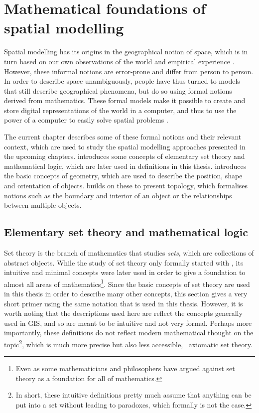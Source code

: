 
\chapter{Mathematical foundations of spatial modelling}
\label{ch:modelling-mathematics}

Spatial modelling has its origins in the geographical notion of space, which is in turn based on our own observations of the world and empirical experience \citep{Couclelis99}.
However, these informal notions are error-prone and differ from person to person.
In order to describe space unambiguously, people have thus turned to models that still describe geographical phenomena, but do so using formal notions derived from mathematics.
These formal models make it possible to create and store digital representations of the world in a computer, and thus to use the power of a computer to easily solve spatial problems \citep{Burrough86,Bailey95}.

The current chapter describes some of these formal notions and their relevant context, which are used to study the spatial modelling approaches presented in the upcoming chapters.
 introduces some concepts of elementary set theory and mathematical logic, which are later used in definitions in this thesis.
 introduces the basic concepts of geometry, which are used to describe the position, shape and orientation of objects.
 builds on these to present topology, which formalises notions such as the boundary and interior of an object or the relationships between multiple objects.

\section{Elementary set theory and mathematical logic}
\label{se:settheory}

Set theory is the branch of mathematics that studies \emph{sets}, which are collections of abstract objects.
While the study of set theory only formally started with \citet{Cantor74}, its intuitive and minimal concepts were later used in order to give a foundation to almost all areas of mathematics\footnote{Even as some mathematicians and philosophers have argued against set theory as a foundation for all of mathematics.}.
Since the basic concepts of set theory are used in this thesis in order to describe many other concepts, this section gives a very short primer using the same notation that is used in this thesis.
However, it is worth noting that the descriptions used here are reflect the concepts generally used in GIS, and so are meant to be intuitive and not very formal.
Perhaps more importantly, these definitions do not reflect modern mathematical thought on the topic\footnote{In short, these intuitive definitions pretty much assume that anything can be put into a set without leading to paradoxes, which formally is not the case.}, which is much more precise but also less accessible, \eg\ axiomatic set theory.

